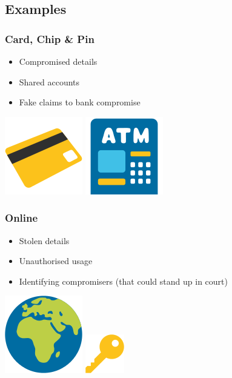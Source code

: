 \documentclass{beamer}
\begin{document}
    \subsection{Examples}
      \begin{frame}
        \frametitle{Card, Chip \& Pin}
        \begin{itemize}
          \item Compromised details
          \item Shared accounts
          \item Fake claims to bank compromise
        \end{itemize}
        \vfill
        \includegraphics[scale=0.25]{card}\cite{WikiCommonsEmoji}
        \hfill
        \includegraphics[scale=0.25]{atm}\cite{WikiCommonsEmoji}
      \end{frame}
      \begin{frame}
        \frametitle{Online}
        \begin{itemize}
          \item Stolen details
          \item Unauthorised usage
          \item Identifying compromisers (that could stand up in court)
        \end{itemize}
        \vfill
        \includegraphics[scale=0.25]{web}\cite{WikiCommonsEmoji}
        \hfill
        \includegraphics[scale=0.5]{password}\cite{WikiCommonsEmoji}
      \end{frame}
\end{document}
